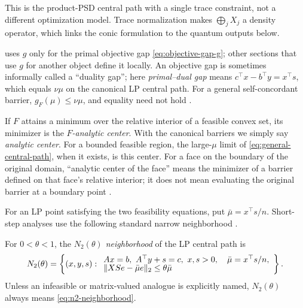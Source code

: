 This is the product-PSD central path with a single trace constraint, not a
different optimization model.  Trace normalization makes $\bigoplus_jX_j$ a
density operator, which links the conic formulation to the quantum outputs
below.

\begin{remark}
\label{rem:g-convention}
 uses $g$ only for the primal objective gap
\eqref{eq:objective-gap-g}; other sections that use $g$ for another object
define it locally.  An objective gap is sometimes informally called
a ``duality gap''; here \emph{primal--dual gap} means
$c^\top x-b^\top y=x^\top s$, which equals $\nu\mu$ on the canonical LP
central path.  For a general self-concordant barrier, $g_F(\mu)\leq\nu\mu$,
and equality need not hold
\cite{nesterov1994-interior-point-polynomial-algorithms-convex}.
\end{remark}

\begin{definition}
\label{def:analytic-center}
If $F$ attains a minimum over the relative interior of a feasible convex set,
its minimizer is the \emph{$F$-analytic center}.  With the canonical barriers
we simply say \emph{analytic center}.  For a bounded feasible region, the
large-$\mu$ limit of \eqref{eq:general-central-path}, when it exists, is this
center.  For a face on the boundary of the original domain, ``analytic center
of the face'' means the minimizer of a barrier defined on that face's relative
interior; it does not mean evaluating the original barrier at a boundary
point \cite{nesterov1994-interior-point-polynomial-algorithms-convex}.
\end{definition}

For an LP point satisfying the two feasibility equations, put
$\bar\mu=x^\top s/n$.  Short-step analyses use the following standard narrow
neighborhood \cite{wright1997-primal-dual-interior-point-methods}.

\begin{definition}
\label{def:n2-neighborhood}
For $0<\theta<1$, the \emph{$N_2(\theta)$ neighborhood} of the LP central path
is
\begin{equation}
 N_2(\theta)=\left\{(x,y,s):
 \begin{array}{l}
 Ax=b,\ A^\top y+s=c,\ x,s>0,\quad \bar\mu=x^\top s/n,\\[-2pt]
 \lVert XSe-\bar\mu e\rVert_2\leq\theta\bar\mu
 \end{array}\right\}.
 \label{eq:n2-neighborhood}
\end{equation}
Unless an infeasible or matrix-valued analogue is explicitly named,
$N_2(\theta)$ always means \eqref{eq:n2-neighborhood}.
\end{definition}

